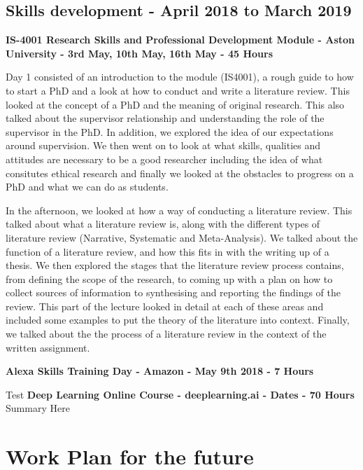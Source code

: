 \documentclass{article}
\begin{document}
	\subsection{Skills development - April 2018 to March 2019}
	\textbf{IS-4001 Research Skills and Professional Development Module - Aston University - 3rd May, 10th May, 16th May - 45 Hours} \newline
	\par
	Day 1 consisted of an introduction to the module (IS4001), a rough guide to how to start a PhD and a look at how to conduct and write a literature review. This looked at the concept of a PhD and the meaning of original research. This also talked about the supervisor relationship and understanding the role of the supervisor in the PhD. In addition, we explored the idea of our expectations around supervision. We then went on to look at what skills, qualities and attitudes are necessary to be a good researcher including the idea of what consitutes ethical research and finally we looked at the obstacles to progress on a PhD and what we can do as students.
	\newline
	\par
	In the afternoon, we looked at how a way of conducting a literature review. This talked about what a literature review is, along with the different types of literature review (Narrative, Systematic and Meta-Analysis). We talked about the function of a literature review, and how this fits in with the writing up of a thesis. We then explored the stages that the literature review process contains, from defining the scope of the research, to coming up with a plan on how to collect sources of information to synthesising and reporting the findings of the review. This part of the lecture looked in detail at each of these areas and included some examples to put the theory of the literature into context. Finally, we talked about the the process of a literature review in the context of the written assignment. 
	\newline
	\par
	\textbf{Alexa Skills Training Day - Amazon - May 9th 2018 - 7 Hours}
	\newline
	\par
	Test
	\newline
	\textbf{Deep Learning Online Course - deeplearning.ai - Dates - 70 Hours}
	Summary Here

	\section{Work Plan for the future}	
\end{document}
